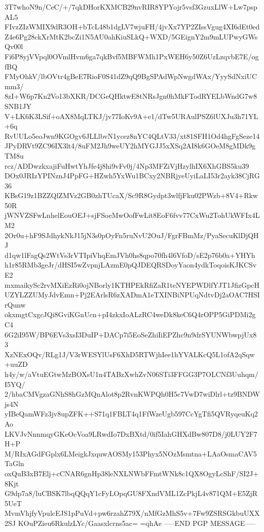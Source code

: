 3T7whoN9n/CeC/+/7qkDHorKXMCB29nvRIR8YPYojr5vsf3GzuxLlW+Lw7pspAL5
FIvzZIzWMIX9dR3OH+bTcL48b1dgLV7wjuFH/4jvXx7YP2ZIssVgug4XI6dEt0ed
Z4e6Pg28ckXrMtK2bcZi1N5AU0ahKiuSLkQ+WXD/5GEignY2m9mLUPwyGWsQv00l
Fi6P8yjVVpql0OVmlHvm6ga7qkBvf5MBFWMh1PxWEH6y50Z6UzLzqvbE7E/ogfBQ
FMyOhkV/lbOVtr4gBeE7RioF0S41dZ9qQ9BgSPAdWpNwgdWAx/YyySdNxiUCmm3/
8zI+W6p7Kn2Vo13bXKR/DCGeQHktwE8tNRsJgn0hMkFTodRYELbWndG7w8SNB1JY
V+LK6K3LSif+oAX8MqLTKJ/jv77IoKv9A+e1/dTw5URAulPSZ6lUXJu3h71YL+6q
RvUULo5eoJwn9KGOgv6JLLlbvN1ycez8nYC4QLtV33/xt81SFH1Od4hgFgSeze14
JPyDRVt9ZC96IX3lt4/8uFM2Jh9weUY2hMYGJJ5xXSq2AI8k6GOeM8gMDk9gTM8u
rcz/ADDwzkxajiFuHwtYhJfe4j8hi9vFv0j/4Np3MFZiVjHzylhIX6XhGBS5ku39
DOx0JRIzYPINznJ4PpFG+HZwh5YxWu1BCxy2NBRjyeUyiLaLI53r2ayk38CjRG36
KBsG19z1BZZQlZMVz2GB0zhTUcaX/Sc9R8Gydpt3wlfjFku02PWzb+8V4+Rkw50R
jWNVZSFwLnhelEouOEJ+sjFSoeMwOofFwLit8EoF6fvv77CxWu2TohUkWFIx4LM2
2Or0u+hF9SJdhykNkJ15jN3s0pOyFn5ruNvU2OuJ/FgrFBmMz/PyaSecuKlDjQHJ
d1qw1lFagQs2WtVs3rVTIpiVhqEmJVh0hs8qpo70fh4l6VfoD/sE2p76b0a+YHYh
h1r85RMb3geJr/dHSI5wZvpnjLAzmE0pQJDEQRSDoyYaon4ydkToqoisKJKCSvE2
mxmaikySc2rvMXiEzRi0ojNBorly1KTHPEkRfiZaR1teNYEPWDlfYJT1JfizGpcH
UZYLZZUMyJdvEmn+Pj2EArlsR6zXADmA1eTXINBiNPUqNdtvDj2aOAC7HSIrQunw
okxmgtCxgcJQi8GviKGnUcn+pI4zkxIoALzRC4weDk8keC6Q4rOPP5GiPDMi2gC4
6G2iI95W/BP6EVs3xsI3DuIP+DACp7i5EoSeZhiIiEPZhc9n9drSYUNWbwpjUx83
XzNExOQv/RLg1J/V3rWESYlUsF6XhD5RTWjhIee1hYVALKcQ5L1ofA2qSqw+uuZD
h4y/w/aVtuEGtwMzBOXsU1n4TABzXwhZvN06STi3FFGG3P7OLCNf3Uuhqm/I5YQ/
2/hbaCMVgzaGNhS8hGzMQnAlot8p2RvnKWPQh0H5c7VwD7wiDlrl+tz9BNDWjs4N
yIBeQamWFz3jv8upZFK++S71q1FBLT4q1FfWzeUgb597CcYgTfi5QVRyqeuKq2Ao
LKVJvNnnmqyGKeOcVoa9LRwdIo7DxBXtd/0if5IahGHXdBw807D8/j0LUY2F7H+P
M/RIxAGdFGplx6LMeigkJxquwAOSMy153Phyx5NOzMsmtna+LAaOsmaCAV5TaGln
oxQuB3xB7Elj+cCNAR6gnHp38leNXLNWbFFmtWNk8c1QX8OgyLcShF/SI2J+8Kjt
G9dp7a8/luCBSK7lbqQQqY1cFyLOpqGU8FXndVML1ZcPkjL4v871QM+E5ZjR5UeT
MvmVhjfyVpulcEJS1pPuVd+pw6rzahZ79X/nMfGzMhS5v+7Fw9ZSRSGkbuUXX2SJ
KOuPZieu6RkulzLYc/Gaasxlcrns5ac=
=qhAe
-----END PGP MESSAGE-----

